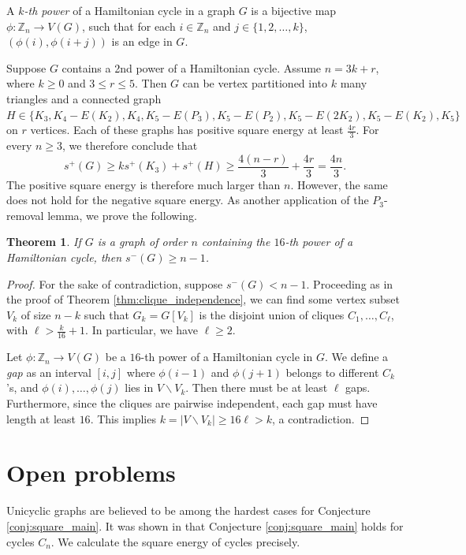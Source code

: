 \documentclass{article}
\newtheorem{theorem}{Theorem}[section]
\begin{document}
A \emph{$k$-th power} of a Hamiltonian cycle in a graph $G$ is a bijective map $\phi: \mathbb{Z}_n \to V(G)$, such that for each $i \in \mathbb{Z}_n$ and $j \in \{1,2,\ldots, k\}$, $(\phi(i), \phi(i + j))$ is an edge in $G$. 

Suppose $G$ contains a 2nd power of a Hamiltonian cycle. Assume $n=3k + r$, where $k\ge 0$ and $3\le r\le 5$. Then $G$ can be vertex partitioned into $k$ many triangles and a connected graph $H\in \{K_3, K_4 - E(K_2), K_4, K_5 - E(P_3), K_5 - E(P_2), K_5 - E(2K_2), K_5 - E(K_2), K_5\}$ on $r$ vertices. Each of these graphs has positive square energy at least $\tfrac{4r}{3}$. For every $n\ge 3$, we therefore conclude that 
\[ s^+(G)\ge k s^+(K_3) + s^+(H) \ge \frac{4(n-r)}{3} + \frac{4r}{3} = \frac{4n}{3}.\]
The positive square energy is therefore much larger than $n$. However, the same does not hold for the negative square energy. As another application of the $P_3$-removal lemma, we prove the following.

\begin{theorem}\label{thm:Hamiltonian_cycle}
If $G$ is a graph of order $n$ containing the $16$-th power of a Hamiltonian cycle, then $s^-(G) \geq n-1$.
\end{theorem}

\begin{proof} 
For the sake of contradiction, suppose $s^-(G) < n-1$. Proceeding as in the proof of Theorem \ref{thm:clique_independence}, we can find some vertex subset $V_k$ of size $n - k$ such that $G_k = G[V_k]$ is the disjoint union of cliques $C_1, \ldots, C_\ell$, with $\ell > \frac{k}{16} + 1$. In particular, we have $\ell \geq 2$.

Let $\phi: \mathbb{Z}_n \to V(G)$ be a $16$-th power of a Hamiltonian cycle in $G$. We define a \emph{gap} as an interval $[i, j]$ where $\phi(i - 1)$ and $\phi(j + 1)$ belongs to different $C_k$'s, and $\phi(i), \ldots, \phi(j)$ lies in $V \backslash V_k$. Then there must be at least $\ell$ gaps. Furthermore, since the cliques are pairwise independent, each gap must have length at least $16$. This implies $k=|V \backslash V_k| \ge 16 \ell > k$,
a contradiction.
\end{proof}

\section{Open problems}\label{section:conclusions}

Unicyclic graphs are believed to be among the hardest cases for Conjecture \ref{conj:square_main}. It was shown in \cite{Aida_2023} that Conjecture \ref{conj:square_main} holds for cycles $C_n$. We calculate the square energy of cycles precisely.
\end{document}
